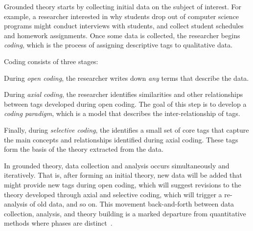 \documentclass[sigconf]{acmart}
\begin{document}
Grounded theory starts by collecting initial data on the subject of interest.
For example, a researcher interested in why students drop out of computer
science programs might conduct interviews with students, and collect student
schedules and homework assignments.
%
Once some data is collected, the researcher begins \emph{coding}, which is the
process of assigning descriptive tags to qualitative data.


Coding consists of three stages:
%
\begin{enumerate*}
%
\item During \emph{open coding}, the researcher writes down \emph{any} terms
that describe the data.
%
\item During \emph{axial coding}, the researcher identifies similarities and
other relationships between tags developed during open coding. The goal of this
step is to develop a \emph{coding paradigm}, which is a model that describes
the inter-relationship of tags.
%
\item Finally, during \emph{selective coding}, the identifies a small set of
core tags that capture the main concepts and relationships identified during
axial coding. These tags form the basis of the theory extracted from the data.
%
\end{enumerate*}


In grounded theory, data collection and analysis occurs simultaneously and
iteratively. That is, after forming an initial theory, new data will be added
that might provide new tags during open coding, which will suggest revisions to
the theory developed through axial and selective coding, which will trigger a
re-analysis of old data, and so on.
%
This movement back-and-forth between data collection, analysis, and theory
building is a marked departure from quantitative methods where phases are
distinct~\cite{Strauss67discoveryof}.
\end{document}
